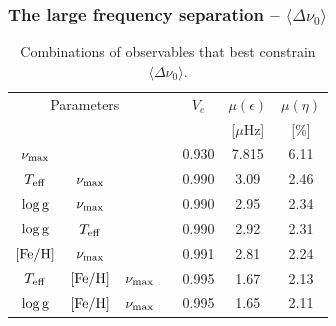 \subsubsection*{The large frequency separation -- $\langle\Delta\nu_0\rangle$}
\begin{table}
\centering
\caption{Combinations of observables that best constrain $\langle\Delta\nu_0\rangle$.}
    \label{tab:dnu}
    \begin{tabular}{ccccccc}
    \hline \hline
\multicolumn{3}{c}{Parameters} && $V_e$ & $\mu (\epsilon)$ & $\mu (\eta)$  \\  
&&&&&[$\mu$Hz] & [\%] \\ \hline
$\nu_{\rm{max}}$ &  &   &&0.930 & 7.815 & 6.11 \\ 
$T_{\rm{eff}}$     & $\nu_{\rm{max}}$&     &&0.990  & 3.09 & 2.46 \\
$\log \rm{g}$     &$\nu_{\rm{max}}$ &               &&0.990  & 2.95 & 2.34 \\
$\log \rm{g}$     &  $T_{\rm{eff}}$&                 & &0.990  & 2.92 & 2.31\\
$[\rm{Fe/H}]$  & $\nu_{\rm{max}}$ &                 &&0.991  & 2.81 & 2.24\\
$T_{\rm{eff}}$ & $[\rm{Fe/H}]$ & $\nu_{\rm{max}}$ && 0.995 & 1.67 & 2.13 \\
$\log \rm{g}$ & $[\rm{Fe/H}]$ & $\nu_{\rm{max}}$ && 0.995 & 1.65 & 2.11\\
\hline
    \end{tabular}
\end{table}


